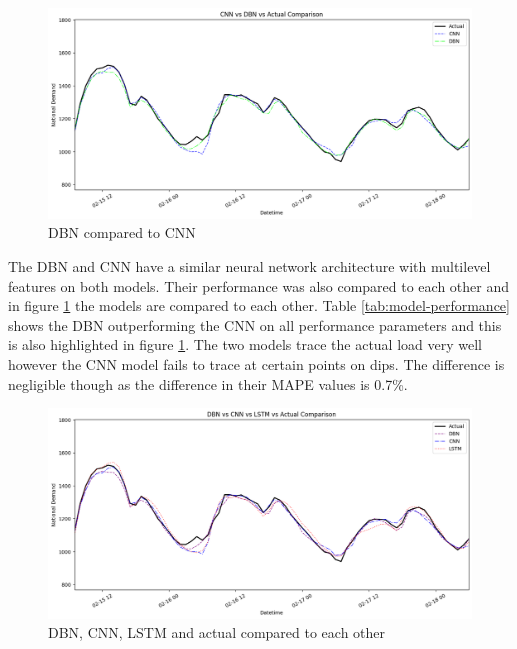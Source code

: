  \begin{figure}[h!]
 	\centering
 	\includegraphics[width=0.75\linewidth]{Chapters/images/results/cnn_vs_dbn_actual}
 	\caption{DBN compared to CNN}
 	\label{fig:cnnvsdbnactual}
 \end{figure}
 The DBN and CNN have a similar neural network architecture with multilevel features on both models. Their performance was also compared to each other and in figure \ref{fig:cnnvsdbnactual} the models are compared to each other. Table \ref{tab:model-performance} shows the DBN outperforming the CNN on all performance parameters and this is also highlighted in figure \ref{fig:cnnvsdbnactual}. The two models trace the actual load very well however the CNN model fails to trace at certain points on dips. The difference is negligible though as the difference in their MAPE values is 0.7\%.
 \begin{figure}[h!]
 	\centering
 	\includegraphics[width=0.75\linewidth]{Chapters/images/results/cnn_vs_dbn_vs_lstm_vs_actual}
 	\caption{DBN, CNN, LSTM and actual compared to each other}
 	\label{fig:cnnvsdbnvslstmvsactual}
 \end{figure}
 
